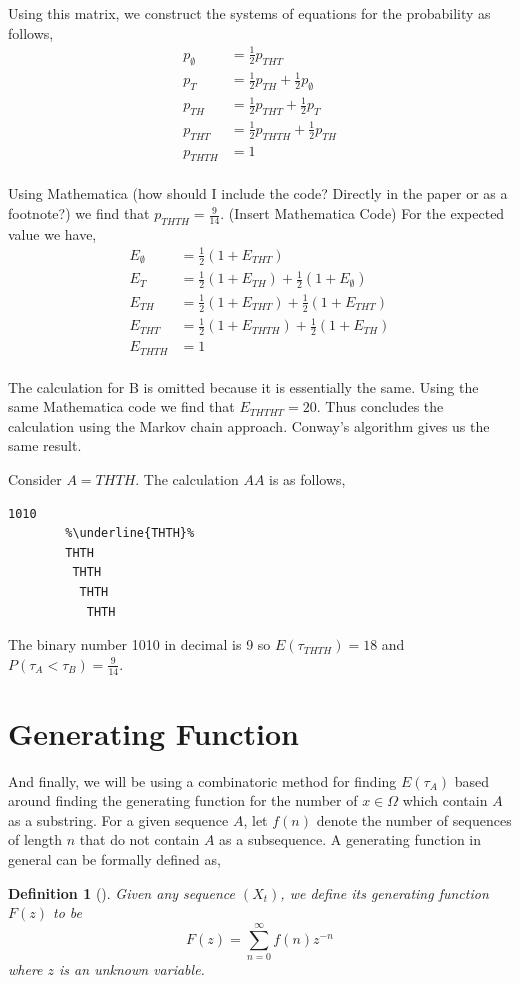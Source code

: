 \documentclass{article}
\newtheorem{definition}[theorem]{Definition}
\numberwithin{mytheorem}{subsection} %
\begin{document}
		Using this matrix, we construct the systems of equations for the probability as follows,
		\begin{equation} 	
		\begin{split}
		p_{\emptyset} & = \frac{1}{2} p_{THT} \\
		p_{T} & = \frac{1}{2} p_{TH} + \frac{1}{2} p_{\emptyset} \\
		p_{TH} & = \frac{1}{2} p_{THT} + \frac{1}{2} p_T \\
		p_{THT} & = \frac{1}{2} p_{THTH} + \frac{1}{2} p_{TH} \\
		p_{THTH} & = 1 \\
		\end{split}
		\end{equation}

		Using Mathematica (how should I include the code? Directly in the paper or as a footnote?) we find that $p_{THTH} = \frac{9}{14}$. (Insert Mathematica Code) For the expected value we have,
		\begin{equation} 	
		\begin{split}
		E_{\emptyset} & = \frac{1}{2} (1 + E_{THT}) \\
		E_{T} & = \frac{1}{2} (1 + E_{TH}) + \frac{1}{2} (1 + E_{\emptyset}) \\
		E_{TH} & = \frac{1}{2} (1 + E_{THT}) + \frac{1}{2} (1 + E_{THT}) \\
		E_{THT} & = \frac{1}{2} (1 + E_{THTH}) + \frac{1}{2} (1 + E_{TH}) \\
		E_{THTH} & = 1 \\
		\end{split}
		\end{equation}

		The calculation for B is omitted because it is essentially the same. Using the same Mathematica code we find that $E_{THTHT} = 20$. Thus concludes the calculation using the Markov chain approach. Conway's algorithm gives us the same result. 

		Consider $A = THTH$. The calculation $AA$ is as follows,   
		\begin{lstlisting}[escapechar=\%]
		1010 
		%\underline{THTH}%
		THTH
		 THTH
		  THTH 
		   THTH 
		\end{lstlisting}

		The binary number 1010 in decimal is 9 so $E(\tau_{THTH}) = 18$ and $P(\tau_A < \tau_B) = \frac{9}{14}$.

		
	\section{Generating Function}
		And finally, we will be using a combinatoric method for finding $E(\tau_A)$ based around finding the generating function for the number of $x \in \Omega$ which contain $A$ as a substring. For a given sequence $A$, let $f(n)$ denote the number of sequences of length $n$ that do not contain $A$ as a subsequence. A generating function in general can be formally defined as,
		\begin{definition}[\cite{enumerate}]
			Given any sequence $(X_t)$, we define its generating function $F(z)$ to be
			$$F(z) = \sum_{n=0}^\infty f(n) z^{-n}$$
			where $z$ is an unknown variable.
		\end{definition}
\end{document}
